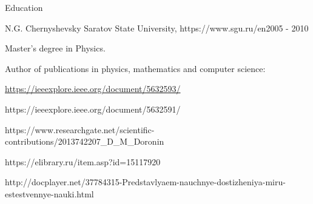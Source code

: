 \documentclass{resume}
\begin{document}

\begin{rSection}{Education}

\begin{rSubsection}{N.G. Chernyshevsky Saratov State University, https://www.sgu.ru/en}{2005 - 2010}{}{}
\item Master's degree in Physics.
\item Author of publications in physics, mathematics and computer science:
\item \url{https://ieeexplore.ieee.org/document/5632593/}
\item https://ieeexplore.ieee.org/document/5632591/
\item https://www.researchgate.net/scientific-contributions/2013742207_D_M_Doronin
\item https://elibrary.ru/item.asp?id=15117920
\item http://docplayer.net/37784315-Predstavlyaem-nauchnye-dostizheniya-miru-estestvennye-nauki.html

\end{rSubsection}

\end{rSection}
\end{document}
